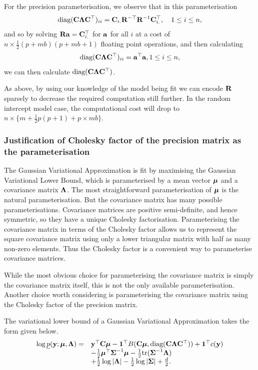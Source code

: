 For the precision parameterisation, we observe that in this parameterisation
\begin{equation*}
	\text{diag}({\bf C} {\boldsymbol \Lambda} {\bf C}^\top)_{ii} = {\bf C}_{i .} {\bf R}^{-\top} {\bf R}^{-1} {\bf C}_{i .}^\top,\quad 1 \leq i \leq n,
\end{equation*}
\noindent and so by solving ${\bf R} {\bf a} = {\bf C}_{i .}^\top$ for ${\bf a}$ for all $i$ at a cost of $n \times
\frac{1}{2} (p + m b) (p + m b + 1)$ floating point operations, and then calculating
\begin{equation*}
	\text{diag}({\bf C} {\boldsymbol \Lambda} {\bf C}^\top)_{ii} = {\bf a}^\top {\bf a}, 1 \leq i \leq n,
\end{equation*}
\noindent we can then calculate $\text{diag}({\bf C} {\boldsymbol \Lambda} {\bf C}^\top)$.
	
As above, by using our knowledge of the model being fit we can encode ${\bf R}$ sparsely to decrease the required
computation still further. In the random intercept model case, the computational cost will drop to $n \times
\{m + \frac{1}{2} p (p + 1) + p \times m b\}$.
			
\subsubsection{Justification of Cholesky factor of the precision matrix as the
parameterisation} The Gaussian Variational Approximation is fit by maximising
the Gaussian Variational Lower Bound, which is parameterised by a mean vector
${\boldsymbol \mu}$ and a covariance matrix ${\boldsymbol \Lambda}$. The most straightforward
parameterisation of ${\boldsymbol \mu}$ is the natural parameterisation. But the covariance
matrix has many possible parameterisations. Covariance matrices are positive
semi-definite, and hence symmetric, so they have a unique Cholesky
factorisation. Parameterising the covariance matrix in terms of the Cholesky
factor allows us to represent the square covariance matrix using only a lower
triangular matrix with half as many non-zero elements. Thus the Cholesky factor
is a convenient way to parameterise covariance matrices.

While the most obvious choice for parameterising the covariance matrix is
simply the covariance matrix itself, this is not the only available
parameterisation. Another choice worth considering is parameterising the
covariance matrix using the Cholesky factor of the precision matrix.

The variational lower bound of a Gaussian Variational Approximation takes the
form given below.
\begin{equation}
\label{eq:gva_lower_bound_precision_param2}
\begin{array}{ll}
\log \underline{p}({\bf y}; {\boldsymbol \mu}, {\boldsymbol \Lambda}) =& {\bf y}^\top {\bf C} {\boldsymbol\mu} - {\bf 1}^\top B({\bf C} {\boldsymbol \mu}, \text{diag}({\bf C} {\boldsymbol \Lambda} {\bf C}^\top)) + {\bf 1}^\top c({\bf y}) \\
&- \tfrac{1}{2} {\boldsymbol \mu}^\top {\boldsymbol\Sigma}^{-1} {\boldsymbol \mu} - \tfrac{1}{2} \text{tr}({\boldsymbol \Sigma}^{-1} {\boldsymbol \Lambda}) \\
&+ \tfrac{1}{2} \log |{\boldsymbol \Lambda}| - \tfrac{1}{2} \log |{\boldsymbol \Sigma}| + \tfrac{d}{2}.
\end{array}
\end{equation}

